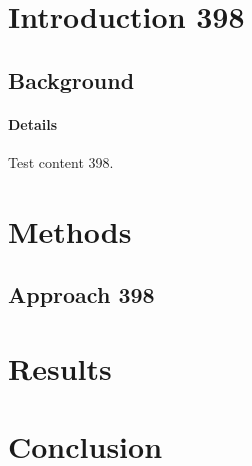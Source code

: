 \documentclass{article}
\begin{document}
\section{Introduction 398}
\subsection{Background}
\paragraph{Details} Test content 398.
\section{Methods}
\subsection{Approach 398}
\section{Results}
\section{Conclusion}
\end{document}
